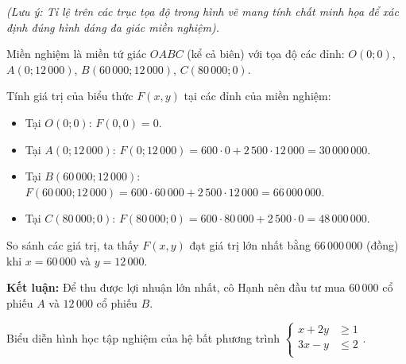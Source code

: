 \begin{vd}
{\begin{center}
		\end{center}
		\textit{(Lưu ý: Tỉ lệ trên các trục tọa độ trong hình vẽ mang tính chất minh họa để xác định đúng hình dáng đa giác miền nghiệm).}
		
		Miền nghiệm là miền tứ giác $OABC$ (kể cả biên) với tọa độ các đỉnh: $O(0; 0)$, $A(0; 12\,000)$, $B(60\,000; 12\,000)$, $C(80\,000; 0)$.
		
		Tính giá trị của biểu thức $F(x, y)$ tại các đỉnh của miền nghiệm:
		\begin{itemize}
			\item Tại $O(0; 0)$: $F(0, 0) = 0$.
			\item Tại $A(0; 12\,000)$: $F(0; 12\,000) = 600 \cdot 0 + 2\,500 \cdot 12\,000 = 30\,000\,000$.
			\item Tại $B(60\,000; 12\,000)$: $F(60\,000; 12\,000) = 600 \cdot 60\,000 + 2\,500 \cdot 12\,000 = 66\,000\,000$.
			\item Tại $C(80\,000; 0)$: $F(80\,000; 0) = 600 \cdot 80\,000 + 2\,500 \cdot 0 = 48\,000\,000$.
		\end{itemize}
		
		So sánh các giá trị, ta thấy $F(x, y)$ đạt giá trị lớn nhất bằng $66\,000\,000$ (đồng) khi $x = 60\,000$ và $y = 12\,000$.
		
		\textbf{Kết luận:} Để thu được lợi nhuận lớn nhất, cô Hạnh nên đầu tư mua $60\,000$ cổ phiếu $A$ và $12\,000$ cổ phiếu $B$.
	}
\end{vd}

\begin{baitap}%
	Biểu diễn hình học tập nghiệm của hệ bất phương trình
	$\left\{\begin{aligned}
		x+2y &\geq 1\\
		3x-y & \leq 2 \\
	\end{aligned}\right.$.
\end{baitap} 

